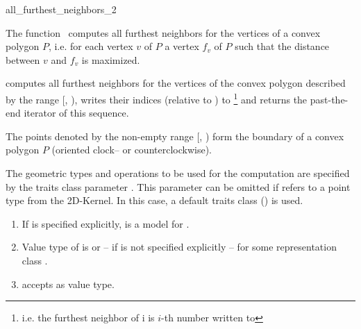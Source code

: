 
\cgalColumnLayout

\begin{ccRefFunction}{all_furthest_neighbors_2}
  
  \ccDefinition The function \ccRefName\ computes all furthest
  neighbors for the vertices of a convex polygon $P$, i.e. for each
  vertex $v$ of $P$ a vertex $f_v$ of $P$ such that the distance
  between $v$ and $f_v$ is maximized.


  \def\ccLongParamLayout{\ccTrue} 
  
  
  computes all furthest neighbors for the vertices of the convex
  polygon described by the range [,
  ), writes their indices (relative to
  ) to \footnote{i.e. the furthest neighbor
    of \ccc{points_begin[}i\ccc{]} is \ccc{points_begin[}$i$-th number
    written to \ccc{]}} and returns the past-the-end iterator
  of this sequence.
  
  \ccPrecond The points denoted by the non-empty range
  [, ) form the boundary of a convex
  polygon $P$ (oriented clock-- or counterclockwise).
  
  The geometric types and operations to be used for the computation
  are specified by the traits class parameter . This parameter
  can be omitted if  refers to a point type from
  the 2D-Kernel. In this case, a default traits class
  () is used.
  
  \ccRequire
  \begin{enumerate}
  \item If  is specified explicitly,  is a model
    for .
  \item Value type of  is  or
    -- if  is not specified explicitly --  for
    some representation class .
  \item {} accepts  as value type.
  \end{enumerate}
  

\end{ccRefFunction}
